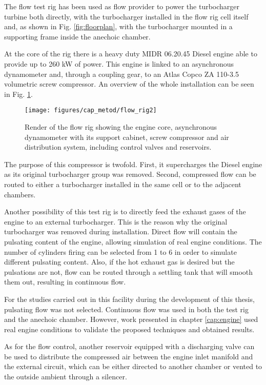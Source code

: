 The flow test rig has been used as flow provider to power the turbocharger turbine both directly, with the turbocharger installed in the flow rig cell itself and, as shown in Fig. \ref{fig:floorplan}, with the turbocharger mounted in a supporting frame inside the anechoic chamber.

At the core of the rig there is a heavy duty MIDR 06.20.45 Diesel engine able to provide up to 260 kW of power. This engine is linked to an asynchronous dynamometer and, through a coupling gear, to an Atlas Copco ZA 110-3.5 volumetric screw compressor. An overview of the whole installation can be seen in Fig. \ref{fig:flowrig_render}.

\begin{figure}[b!]
\centering
\texttt{[image: figures/cap\_metod/flow\_rig2]}
\caption[Render of the flow rig used to power the turbocharger]{Render of the flow rig showing the engine core, asynchronous dynamometer with its support cabinet, screw compressor and air distribution system, including control valves and reservoirs.}
\label{fig:flowrig_render}
\end{figure}

The purpose of this compressor is twofold. First, it supercharges the Diesel engine as its original turbocharger group was removed. Second, compressed flow can be routed to either a turbocharger installed in the same cell or to the adjacent chambers.

Another possibility of this test rig is to directly feed the exhaust gases of the engine to an external turbocharger. This is the reason why the original turbocharger was removed during installation. Direct flow will contain the pulsating content of the engine, allowing simulation of real engine conditions.
The number of cylinders firing can be selected from 1 to 6 in order to simulate different pulsating content. Also, if the hot exhaust gas is desired but the pulsations are not, flow can be routed through a settling tank that will smooth them out, resulting in continuous flow.

For the studies carried out in this facility during the development of this thesis, pulsating flow was not selected. Continuous flow was used in both the test rig and the anechoic chamber. However, work presented in chapter \ref{cap:engine} used real engine conditions to validate the proposed techniques and obtained results.

As for the flow control, another reservoir equipped with a discharging valve can be used to distribute the compressed air between the engine inlet manifold and the external circuit, which can be either directed to another chamber or vented to the outside ambient through a silencer.

